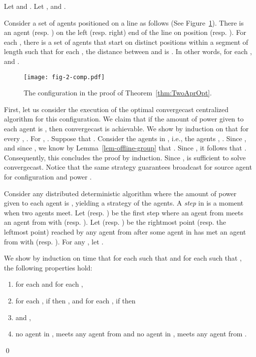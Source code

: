 \documentclass{article}
\newenvironment{proofof}[1]{\medskip\noindent {\bf Proof of #1 : }} { \qed \medskip }
\newcommand\convergecast{convergecast\xspace}
\begin{document}
\begin{proofof}{Theorem \ref{thm:TwoAprOpt}}
Let  and . Let ,  and .


Consider a set of  agents positioned on a line as follows (See
Figure~\ref{fig-2-comp}).  There is an agent 
(resp. ) on the left (resp. right) end of the line on
position  (resp. ). For each ,
there is a set  of  agents that start on distinct positions
within a segment  of length  such that for each , the distance between  and  is
. In other words, for each ,  and .

\begin{figure}
\centering
\texttt{[image: fig-2-comp.pdf]}\caption{The configuration in the proof of Theorem~\ref{thm:TwoAprOpt}.}
\label{fig-2-comp}
\end{figure}

First, let us consider the execution of the optimal convergecast centralized algorithm for this
configuration. We claim that if the amount of power given to each
agent is , then {\convergecast} is achievable. We show by induction on
 that for every , . For , . Suppose that . Consider the agents in , i.e., the agents ,
. Since , and since ,
we know by Lemma~\ref{lem-offline-group} that
. Since , it
follows that . Consequently, this concludes the proof by induction. Since ,  is sufficient to solve
{\convergecast}. Notice that the same strategy guarantees broadcast for source agent  for configuration 
 and power .

\medskip


Consider any distributed deterministic algorithm where the amount of power
given to each agent is , yielding a strategy  of the agents. 
 A \emph{step} in  is a moment when two
agents meet.  Let  (resp. ) be the first step where an
agent from  meets an agent from  with  (resp. ).  Let  (resp. ) be the rightmost point
(resp. the leftmost point) reached by any agent from  after some agent in
 has met an agent from  with  (resp. ). For any , let .


We show by induction on time  that for each  such that
 and for each  such that , the following properties hold:
\begin{enumerate}[]
\item  for each  and 
  for each , 
\item for each , if  then , and
  for each , if  then  
\item  and  ,
\item no agent in ,  meets
  any agent from  and no agent in , 
  meets any agent from .
\end{enumerate}


\end{proofof}
\end{document}
